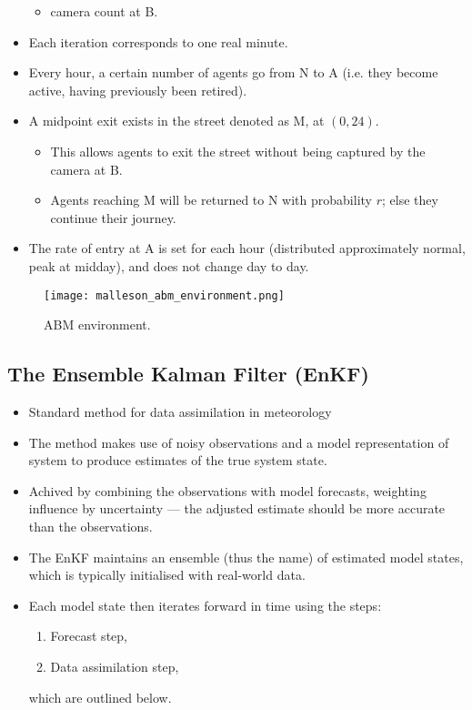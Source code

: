 \begin{itemize}
\begin{itemize}
        \item camera count at B.
    \end{itemize}
    \item Each iteration corresponds to one real minute.
    \item Every hour, a certain number of agents go from N to A (i.e. they become active, having previously been retired).
    \item A midpoint exit exists in the street denoted as M, at $\left( 0, 24 \right)$.
    \begin{itemize}
        \item This allows agents to exit the street without being captured by the camera at B.
        \item Agents reaching M will be returned to N with probability $r$; else they continue their journey.
    \end{itemize}
    \item The rate of entry at A is set for each hour (distributed approximately normal, peak at midday), and does not change day to day.
\end{itemize}

\begin{figure}
  \centering
    \texttt{[image: malleson\_abm\_environment.png]}
  \caption{ABM environment.}
  \label{fig:malleson_abm_environment}
\end{figure}

\subsection{The Ensemble Kalman Filter (EnKF)}
\label{malleson:methods:enkf}

\begin{itemize}
    \item Standard method for data assimilation in meteorology
    \item The method makes use of noisy observations and a model representation of system to produce estimates of the true system state.
    \item Achived by combining the observations with model forecasts, weighting influence by uncertainty --- the adjusted estimate should be more accurate than the observations.
    \item The EnKF maintains an ensemble (thus the name) of estimated model states, which is typically initialised with real-world data.
    \item Each model state then iterates forward in time using the steps:
    \begin{enumerate}
        \item Forecast step,
        \item Data assimilation step,
    \end{enumerate}
    which are outlined below.
\end{itemize}

